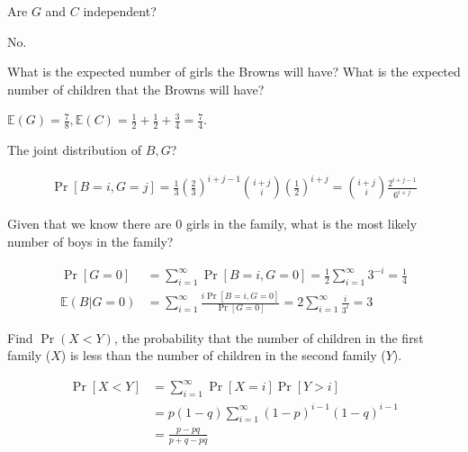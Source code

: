 \documentclass[11pt]{article}
\newcommand{\E}[0]{\mathbb{E}}
\begin{document}
\begin{Parts}
    \Part Are $G$ and $C$ independent?

    \begin{Answer}
        No.
    \end{Answer}

    \Part What is the expected number of girls the Browns will have? What is the expected number of children that the Browns will have?

    \begin{Answer}
        $\E(G) = \frac{7}{8}, \E(C) = \frac{1}{2} + \frac{1}{2} + \frac{3}{4} = \frac{7}{4}$. 
    \end{Answer}

\end{Parts}

\newpage
{}

\begin{Parts}
    
    \Part The joint distribution of $B, G$? 

    \begin{Answer}
        \begin{align*}
            \Pr[B = i, G = j] = \frac{1}{3}(\frac{2}{3})^{i+j-1}{i+j \choose i}(\frac{1}{2})^{i+j} = {i+j \choose i}\frac{2^{i+j-1}}{6^{i+j}}
        \end{align*}
    \end{Answer}

    \Part Given that we know there are $0$ girls in the family, what is the most likely number of boys in the family?

    \begin{Answer}
        \begin{align*}
            \Pr[G=0]  &= \sum_{i=1}^{\infty} \Pr[B=i,G=0]=\frac{1}{2}\sum_{i=1}^{\infty}3^{-i}=\frac{1}{4} \\
            \E(B|G=0) &= \sum_{i=1}^{\infty} \frac{i\Pr[B=i,G=0]}{\Pr[G=0]} = 2\sum_{i=1}^{\infty} \frac{i}{3^i} = 3
        \end{align*}
    \end{Answer}
    
    \Part Find $\Pr(X < Y)$, the probability that the number of children in the first family ($X$) is less than the number of children in the second family ($Y$).

    \begin{Answer}
        \begin{align*}
            \Pr[X<Y] &= \sum_{i=1}^{\infty} \Pr[X=i]\Pr[Y>i] \\
                     &= p(1-q)\sum_{i=1}^{\infty} (1-p)^{i-1}(1-q)^{i-1} \\
                     &= \frac{p - pq}{p + q - pq}
        \end{align*}
    \end{Answer}
    

\end{Parts}
\end{document}
